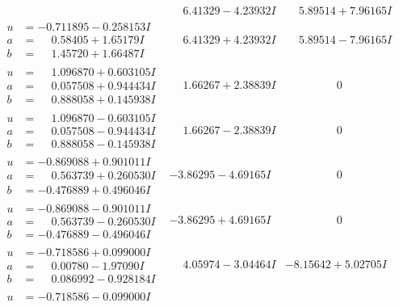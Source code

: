 \documentclass[1p]{elsarticle_modified}
\theoremstyle{definition}
\begin{document}
$$\begin{array}{c|c|c}
 & \phantom{-}6.41329 - 4.23932 I & \phantom{-}5.89514 + 7.96165 I \\ \hline\begin{aligned}
u &= -0.711895 - 0.258153 I \\
a &= \phantom{-}0.58405 + 1.65179 I \\
b &= \phantom{-}1.45720 + 1.66487 I\end{aligned}
 & \phantom{-}6.41329 + 4.23932 I & \phantom{-}5.89514 - 7.96165 I \\ \hline\begin{aligned}
u &= \phantom{-}1.096870 + 0.603105 I \\
a &= \phantom{-}0.057508 + 0.944434 I \\
b &= \phantom{-}0.888058 + 0.145938 I\end{aligned}
 & \phantom{-}1.66267 + 2.38839 I & \phantom{-0.000000 } 0 \\ \hline\begin{aligned}
u &= \phantom{-}1.096870 - 0.603105 I \\
a &= \phantom{-}0.057508 - 0.944434 I \\
b &= \phantom{-}0.888058 - 0.145938 I\end{aligned}
 & \phantom{-}1.66267 - 2.38839 I & \phantom{-0.000000 } 0 \\ \hline\begin{aligned}
u &= -0.869088 + 0.901011 I \\
a &= \phantom{-}0.563739 + 0.260530 I \\
b &= -0.476889 + 0.496046 I\end{aligned}
 & -3.86295 - 4.69165 I & \phantom{-0.000000 } 0 \\ \hline\begin{aligned}
u &= -0.869088 - 0.901011 I \\
a &= \phantom{-}0.563739 - 0.260530 I \\
b &= -0.476889 - 0.496046 I\end{aligned}
 & -3.86295 + 4.69165 I & \phantom{-0.000000 } 0 \\ \hline\begin{aligned}
u &= -0.718586 + 0.099000 I \\
a &= \phantom{-}0.00780 - 1.97090 I \\
b &= \phantom{-}0.086992 - 0.928184 I\end{aligned}
 & \phantom{-}4.05974 - 3.04464 I & -8.15642 + 5.02705 I \\ \hline\begin{aligned}
u &= -0.718586 - 0.099000 I \\

\end{aligned}
\end{array}$$
\end{document}
